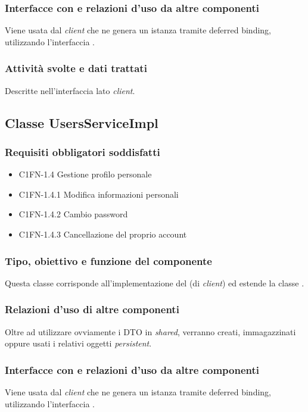 \subsubsection*{Interfacce con e relazioni d'uso da altre componenti}
Viene usata dal \emph{client} che ne genera un istanza tramite deferred binding,
utilizzando l'interfaccia .

\subsubsection*{Attivit\`a svolte e dati trattati}
Descritte nell'interfaccia lato \emph{client}.

\subsection{Classe UsersServiceImpl}
\subsubsection*{Requisiti obbligatori soddisfatti}
\begin{itemize}
	\item C1FN-1.4 Gestione profilo personale
	\item C1FN-1.4.1 Modifica informazioni personali
	\item C1FN-1.4.2 Cambio password
	\item C1FN-1.4.3 Cancellazione del proprio account
\end{itemize}
\subsubsection*{Tipo, obiettivo e funzione del componente}
Questa classe corrisponde all'implementazione del  (di
\emph{client}) ed estende la classe .

\subsubsection*{Relazioni d'uso di altre componenti}
Oltre ad utilizzare ovviamente i DTO in \emph{shared}, verranno creati,
immagazzinati oppure usati i relativi oggetti \emph{persistent}.

\subsubsection*{Interfacce con e relazioni d'uso da altre componenti}
Viene usata dal \emph{client} che ne genera un istanza tramite deferred binding,
utilizzando l'interfaccia .

